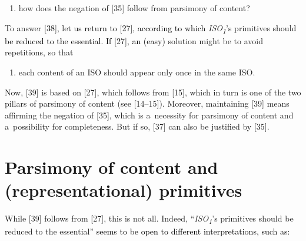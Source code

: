 \begin{enumerate}

\setcounter{enumi}{\value{saveenum}}

\item how does the negation of [35] follow from parsimony of content?

\end{enumerate}

To answer [\textcolor{black}{38], let us return to [27], according to which} \textit{ISO}\textit{\textsubscript{1}}\textcolor{black}{'s }primitives \textcolor{black}{should be reduced to the essential. If [27], an (easy) s}olution might be to avoid repetitions, so that



\setcounter{saveenum}{\value{enumi}}

\begin{enumerate}

\setcounter{enumi}{\value{saveenum}}

\item each content of an ISO should appear only once in the same ISO.

\end{enumerate}

Now, [39] is based on [27], which follows from [15], which in turn is one of the two pillars of parsimony of content (see [14–15]). Moreover, maintaining [39] means affirming the negation of [35], which is a~necessity for parsimony of content and a~possibility for completeness. But if so, [37] can also be justified by [35].



\section{Parsimony of content and (representational) primitives}

While [39] follows from [27], this is not all. Indeed, ``\textit{ISO}\textit{\textsubscript{1}}'s primitives should be reduced to the essential'' \textcolor{black}{seems to be open to different interpretations, such as:}



\setcounter{saveenum}{\value{enumi}}

